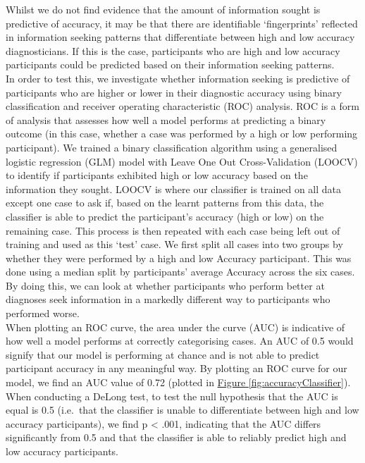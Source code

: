 \documentclass[a4paper, nobind]{templates/ociamthesis}
\begin{document}
Whilst we do not find evidence that the amount of information sought is predictive of accuracy, it may be that there are identifiable `fingerprints' reflected in information seeking patterns that differentiate between high and low accuracy diagnosticians. If this is the case, participants who are high and low accuracy participants could be predicted based on their information seeking patterns.\\

In order to test this, we investigate whether information seeking is predictive of participants who are higher or lower in their diagnostic accuracy using binary classification and receiver operating characteristic (ROC) analysis. ROC is a form of analysis that assesses how well a model performs at predicting a binary outcome (in this case, whether a case was performed by a high or low performing participant). We trained a binary classification algorithm using a generalised logistic regression (GLM) model with Leave One Out Cross-Validation (LOOCV) to identify if participants exhibited high or low accuracy based on the information they sought. LOOCV is where our classifier is trained on all data except one case to ask if, based on the learnt patterns from this data, the classifier is able to predict the participant's accuracy (high or low) on the remaining case. This process is then repeated with each case being left out of training and used as this `test' case. We first split all cases into two groups by whether they were performed by a high and low Accuracy participant. This was done using a median split by participants' average Accuracy across the six cases. By doing this, we can look at whether participants who perform better at diagnoses seek information in a markedly different way to participants who performed worse.\\

When plotting an ROC curve, the area under the curve (AUC) is indicative of how well a model performs at correctly categorising cases. An AUC of 0.5 would signify that our model is performing at chance and is not able to predict participant accuracy in any meaningful way. By plotting an ROC curve for our model, we find an AUC value of 0.72 (plotted in \hyperref[fig:accuracyClassifier]{Figure \ref{fig:accuracyClassifier}}). When conducting a DeLong test, to test the null hypothesis that the AUC is equal is 0.5 (i.e.~that the classifier is unable to differentiate between high and low accuracy participants), we find p \textless{} .001, indicating that the AUC differs significantly from 0.5 and that the classifier is able to reliably predict high and low accuracy participants.\\
\end{document}
